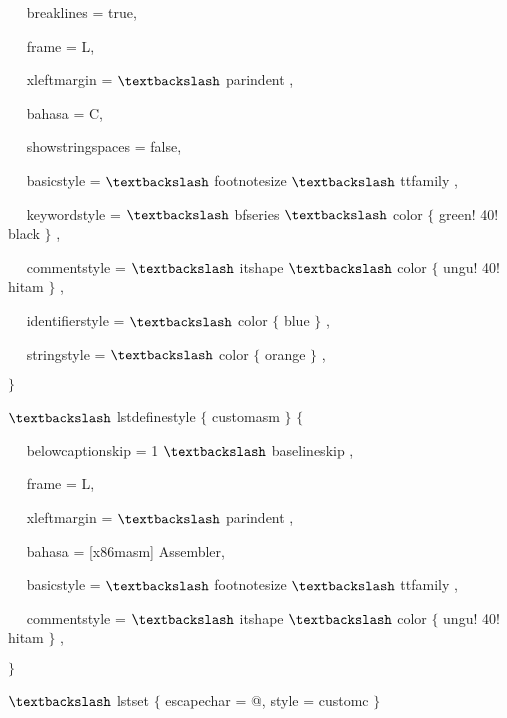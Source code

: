 ~~ breaklines = true,\par

~~ frame = L,\par

~~ xleftmargin = $\textbackslash$ parindent ,\par

~~ bahasa = C,\par

~~ showstringspaces = false,\par

~~ basicstyle = $\textbackslash$ footnotesize $\textbackslash$ ttfamily ,\par

~~ keywordstyle = $\textbackslash$ bfseries $\textbackslash$ color $ \{ $ green! 40! black $ \} $ ,\par

~~ commentstyle = $\textbackslash$ itshape $\textbackslash$ color $ \{ $ ungu! 40! hitam $ \} $ ,\par

~~ identifierstyle = $\textbackslash$ color $ \{ $ blue $ \} $ ,\par

~~ stringstyle = $\textbackslash$ color $ \{ $ orange $ \} $ ,\par

 $ \} $\par

 $\textbackslash$ lstdefinestyle $ \{ $ customasm $ \} $ $ \{ $\par

~~ belowcaptionskip = 1 $\textbackslash$ baselineskip ,\par

~~ frame = L,\par

~~ xleftmargin = $\textbackslash$ parindent ,\par

~~ bahasa = [x86masm] Assembler,\par

~~ basicstyle = $\textbackslash$ footnotesize $\textbackslash$ ttfamily ,\par

~~ commentstyle = $\textbackslash$ itshape $\textbackslash$ color $ \{ $ ungu! 40! hitam $ \} $ ,\par

 $ \} $\par

 $\textbackslash$ lstset $ \{ $ escapechar = @, style = customc $ \} $\par


